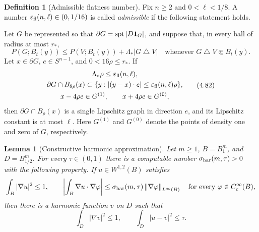 \documentclass[11pt]{amsart}
\newtheorem{lemma}[theorem]{Lemma}
\theoremstyle{definition}
\newtheorem{definition}[theorem]{Definition}
\newcommand{\Per}{P}
\newcommand{\norm}[1]{\left\|#1\right\|}
\begin{document}
\begin{definition}[Admissible flatness number]\label{def:flat-number}
Fix \(n\ge2\) and \(0<\ell<1/8\).  A number
\(\varepsilon_{\rm fl}(n,\ell)\in(0,1/16)\) is called
\emph{admissible} if the following statement holds.

Let \(G\) be represented so that
\(\partial G=\operatorname{spt}|D{\bf1}_G|\), and suppose that, in every
ball of radius at most \(r_*\),
\[
   \Per(G;B_t(y))
   \le\Per(V;B_t(y))+\Lambda_*|G\mathbin{\triangle}V|
   \quad\text{whenever }G\mathbin{\triangle}V\Subset B_t(y).
\tag{4.81}\label{eq:local-am-input}
\]
Let \(x\in\partial G\), \(e\in S^{n-1}\), and \(0<16\rho\le r_*\).
If
\[
\begin{gathered}
   \Lambda_*\rho\le\varepsilon_{\rm fl}(n,\ell),\\
   \partial G\cap B_{8\rho}(x)
      \subset
      \{y: |(y-x)\cdot e|\le
                 \varepsilon_{\rm fl}(n,\ell)\rho\},\\
   x-4\rho e\in G^{(1)},\qquad x+4\rho e\in G^{(0)},
\end{gathered}
\tag{4.82}\label{eq:local-flat-input}
\]
then \(\partial G\cap B_\rho(x)\) is a single Lipschitz graph in
direction \(e\), and its Lipschitz constant is at most \(\ell\).
Here \(G^{(1)}\) and \(G^{(0)}\) denote the points of density one and
zero of \(G\), respectively.
\end{definition}

\begin{lemma}[Constructive harmonic approximation]\label{lem:effective-harmonic}
Let \(m\ge1\), \(B=B_1^m\), and \(D=B_{1/2}^m\).  For every
\(\tau\in(0,1)\) there is a computable number
\(\sigma_{\rm har}(m,\tau)>0\) with the following property.  If
\(u\in W^{1,2}(B)\) satisfies
\[
   \int_B|\nabla u|^2\le1,\qquad
   \left|\int_B\nabla u\cdot\nabla\varphi\right|
      \le\sigma_{\rm har}(m,\tau)
          \norm{\nabla\varphi}_{L^\infty(B)}
   \quad\text{for every }\varphi\in C_c^\infty(B),
\]
then there is a harmonic function \(v\) on \(D\) such that
\[
   \int_D|\nabla v|^2\le1,\qquad
   \int_D|u-v|^2\le\tau.
\]
\end{lemma}
\end{document}
